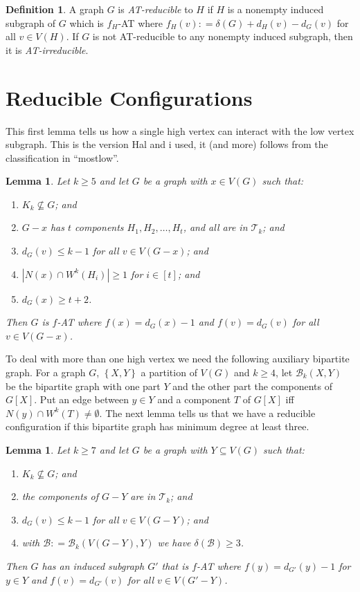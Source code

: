\documentclass[12pt]{article}
\theoremstyle{plain}
\newtheorem{lem}[thm]{Lemma}
\theoremstyle{definition}
\newtheorem{defn}{Definition}
\theoremstyle{remark}
\newcommand{\fancy}[1]{\mathcal{#1}}
\newcommand{\T}{\fancy{T}}
\newcommand{\B}{\fancy{B}}
\newcommand{\set}[1]{\left\{ #1 \right\}}
\newcommand{\card}[1]{\left|#1\right|}
\newcommand{\irange}[1]{\left[#1\right]}
\newcommand{\DefinedAs}{\mathrel{\mathop:}=}
\begin{document}
\begin{defn}
	A graph $G$ is \emph{AT-reducible} to $H$ if $H$ is a nonempty induced subgraph of $G$ which is $f_H$-AT where $f_H(v) \DefinedAs \delta(G) + d_H(v) - d_G(v)$ for all $v \in V(H)$.  
	If $G$ is not AT-reducible to any nonempty induced subgraph, then it is \emph{AT-irreducible}.
\end{defn}

\section{Reducible Configurations}


This first lemma tells us how a single high vertex can interact with the low vertex subgraph.  This is the version Hal and i used, it (and more) follows from the classification in ``mostlow''.

\begin{lem}\label{ConfigurationTypeOneEuler}
Let $k \ge 5$ and let $G$ be a graph with $x \in V(G)$ such that:
\begin{enumerate}
\item $K_k \not \subseteq G$; and
\item $G-x$ has $t$ components $H_1, H_2, \ldots, H_t$, and all are in $\T_k$; and
\item $d_G(v) \leq k - 1$ for all $v \in V(G-x)$; and
\item $\card{N(x) \cap W^k(H_i)} \ge 1$ for $i \in \irange{t}$; and
\item $d_G(x) \ge t+2$.
\end{enumerate}

\noindent Then $G$ is $f$-AT where $f(x) = d_G(x) - 1$ and $f(v) = d_G(v)$ for all $v \in V(G - x)$.
\end{lem}

To deal with more than one high vertex we need the following auxiliary bipartite graph.  For a graph $G$, $\set{X, Y}$ a partition of $V(G)$ and $k \ge 4$, let $\B_k(X, Y)$ be the bipartite graph with one part $Y$ and the other part the components of $G[X]$.  Put an edge between $y \in Y$ and a component $T$ of $G[X]$ iff $N(y) \cap W^k(T) \ne \emptyset$.   The next lemma tells us that we have a reducible configuration if this bipartite graph has minimum degree at least three.  

\begin{lem}
	\label{MultipleHighConfigurationEuler} Let $k\ge7$ and let $G$ be a graph with
	$Y\subseteq V(G)$ such that: 
	\begin{enumerate}
		\item $K_{k}\not\subseteq G$; and 
		\item the components of $G-Y$ are in $\T_{k}$; and 
		\item $d_{G}(v)\leq k-1$ for all $v\in V(G-Y)$; and 
		\item with $\B\DefinedAs\B_{k}(V(G-Y),Y)$ we have $\delta(\B)\ge3$. 
	\end{enumerate}
	\noindent Then $G$ has an induced subgraph $G'$ that is $f$-AT where $f(y)=d_{G'}(y)-1$
	for $y\in Y$ and $f(v)=d_{G'}(v)$ for all $v\in V(G'-Y)$.\end{lem}
\end{document}
